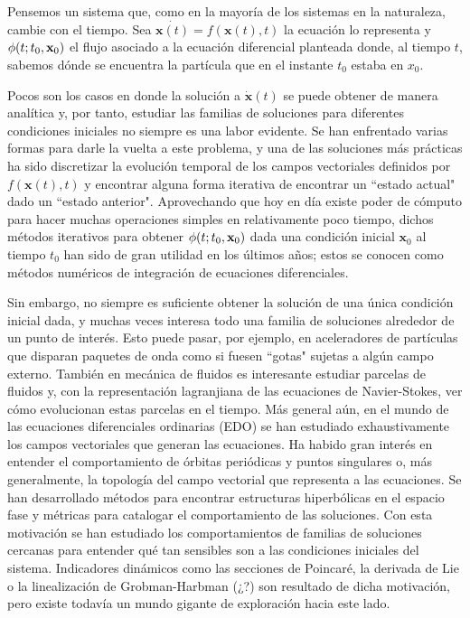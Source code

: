 Pensemos un sistema que, como en la mayoría de los sistemas en la naturaleza, cambie con el tiempo. Sea $\dot{\mathbf{x}(t)} = f(\mathbf{x}(t),t)$ la ecuación lo representa y $\phi(t;t_0,\mathbf{x}_0)$ el flujo asociado a la ecuación diferencial planteada donde, al tiempo $t$, sabemos dónde se encuentra la partícula que en el instante $t_0$ estaba en $x_0$. 

Pocos son los casos en donde la solución a $\dot{\mathbf{x}}(t)$ se puede obtener de manera analítica y, por tanto, estudiar las familias de soluciones para diferentes condiciones iniciales no siempre es una labor evidente. Se han enfrentado varias formas para darle la vuelta a este problema, y una de las soluciones más prácticas ha sido discretizar la evolución temporal de los campos vectoriales definidos por $f(\mathbf{x}(t),t)$ y encontrar alguna forma iterativa de encontrar un ``estado actual" dado un ``estado anterior". Aprovechando que hoy en día existe poder de cómputo para hacer muchas operaciones simples en relativamente poco tiempo, dichos métodos iterativos para obtener $\phi(t;t_0,\mathbf{x}_0)$ dada una condición inicial $\mathbf{x}_0$ al tiempo $t_0$ han sido de gran utilidad en los últimos años; estos se conocen como métodos numéricos de integración de ecuaciones diferenciales. 

Sin embargo, no siempre es suficiente obtener la solución de una única condición inicial dada, y muchas veces interesa todo una familia de soluciones alrededor de un punto de interés. Esto puede pasar, por ejemplo, en aceleradores de partículas que disparan paquetes de onda como si fuesen ``gotas" sujetas a algún campo externo. También en mecánica de fluidos es interesante estudiar parcelas de fluidos y, con la representación lagranjiana de las ecuaciones de Navier-Stokes, ver cómo evolucionan estas parcelas en el tiempo. 
Más general aún, en el mundo de las ecuaciones diferenciales ordinarias (EDO) se han estudiado exhaustivamente los campos vectoriales que generan las ecuaciones. Ha habido gran interés en entender el comportamiento de órbitas periódicas y puntos singulares o, más generalmente, la topología del campo vectorial que representa a las ecuaciones. Se han desarrollado métodos para encontrar estructuras hiperbólicas en el espacio fase y métricas para catalogar el comportamiento de las soluciones. Con esta motivación se han estudiado los comportamientos de familias de soluciones cercanas para entender qué tan sensibles son a las condiciones iniciales del sistema. Indicadores dinámicos como las secciones de Poincaré, la derivada de Lie o la linealización de Grobman-Harbman (¿?) son resultado de dicha motivación, pero existe todavía un mundo gigante de exploración hacia este lado.

